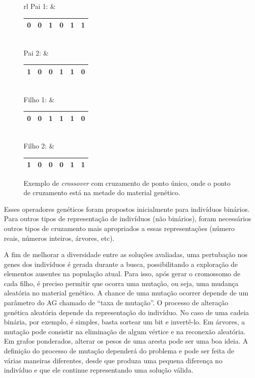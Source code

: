 \begin{figure}[!htbp]
	\centering
	\renewcommand{\arraystretch}{2} 
	\begin{tabular}{rl}
		Pai 1: & 
		\renewcommand{\arraystretch}{1.15} 
		\begin{tabular}{|c|c|c|c|c|c|}
			\hline 
			\rowcolor[HTML]{F5D1CF}
			0 & 0 & 1 & 0 & 1 & 1 \\
			\hline 
		\end{tabular}
		\\
		Pai 2: & 
		\renewcommand{\arraystretch}{1.15} 
		\begin{tabular}{|c|c|c|c|c|c|}
			\hline 
			\rowcolor[HTML]{CCCCFF}
			1 & 0 & 0 & 1 & 1 & 0 \\
			\hline 
		\end{tabular}
		\\
		Filho 1: & 
		\renewcommand{\arraystretch}{1.15} 
		\begin{tabular}{|c|c|c|c|c|c|}
			\hline 
			\cellcolor[HTML]{F5D1CF}0 & \cellcolor[HTML]{F5D1CF}0 & \cellcolor[HTML]{F5D1CF}1 & \cellcolor[HTML]{CCCCFF}1 & \cellcolor[HTML]{CCCCFF}1 & \cellcolor[HTML]{CCCCFF}0 \\
			\hline 
		\end{tabular}
		\\
		Filho 2: & 
		\renewcommand{\arraystretch}{1.15} 
		\begin{tabular}{|c|c|c|c|c|c|}
			\hline 
			\cellcolor[HTML]{CCCCFF}1 & \cellcolor[HTML]{CCCCFF}0 & \cellcolor[HTML]{CCCCFF}0 & \cellcolor[HTML]{F5D1CF}0 & \cellcolor[HTML]{F5D1CF}1 & \cellcolor[HTML]{F5D1CF}1 \\
			\hline 
		\end{tabular}
	\end{tabular}
	\caption{\label{fig_cross_ponto_unico}Exemplo de \textit{crossover} com cruzamento de ponto único, onde o ponto de cruzamento está na metade do material genético.}
\end{figure}

Esses operadores genéticos foram propostos inicialmente para indivíduos binários. Para outros tipos de representação de indivíduos (não binários), foram necessários outros tipos de cruzamento mais apropriados a essas representações (número reais, números inteiros, árvores, etc).

A fim de melhorar a diversidade entre as soluções avaliadas, uma pertubação nos genes dos indivíduos é gerada durante a busca, possibilitando a exploração de elementos ausentes na população atual. Para isso, após gerar o cromossomo de cada filho, é preciso permitir que ocorra uma mutação, ou seja, uma mudança aleatória no material genético. A chance de uma mutação ocorrer depende de um parâmetro do AG chamado de ``taxa de mutação''. O processo de alteração genética aleatória depende da representação do indivíduo. No caso de uma cadeia binária, por exemplo, é simples, basta sortear um bit e invertê-lo. Em árvores, a mutação pode consistir na eliminação de algum vértice e na reconexão aleatória. Em grafos ponderados, alterar os pesos de uma aresta pode ser uma boa ideia. A definição do processo de mutação dependerá do problema e pode ser feita de várias maneiras diferentes, desde que produza uma pequena diferença no indivíduo e que ele continue representando uma solução válida.

